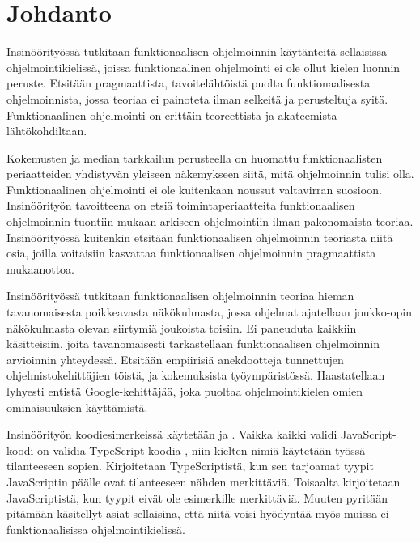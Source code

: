 
\chapter{Johdanto}


Insinöörityössä tutkitaan funktionaalisen ohjelmoinnin käytänteitä sellaisissa ohjelmointikielissä, joissa funktionaalinen ohjelmointi ei ole ollut kielen luonnin peruste. Etsitään pragmaattista, tavoitelähtöistä puolta funktionaalisesta ohjelmoinnista, jossa teoriaa ei painoteta ilman selkeitä ja perusteltuja syitä. Funktionaalinen ohjelmointi on erittäin teoreettista ja akateemista lähtökohdiltaan.

Kokemusten ja median tarkkailun perusteella on huomattu funktionaalisten periaatteiden yhdistyvän yleiseen näkemykseen siitä, mitä ohjelmoinnin tulisi olla. Funktionaalinen ohjelmointi ei ole kuitenkaan noussut valtavirran suosioon. Insinöörityön tavoitteena on etsiä toimintaperiaatteita funktionaalisen ohjelmoinnin tuontiin mukaan arkiseen ohjelmointiin ilman pakonomaista teoriaa. Insinöörityössä kuitenkin etsitään funktionaalisen ohjelmoinnin teoriasta niitä osia, joilla voitaisiin kasvattaa funktionaalisen ohjelmoinnin pragmaattista mukaanottoa.

Insinöörityössä tutkitaan funktionaalisen ohjelmoinnin teoriaa hieman tavanomaisesta poikkeavasta näkökulmasta, jossa ohjelmat ajatellaan joukko-opin näkökulmasta olevan siirtymiä joukoista toisiin. Ei paneuduta kaikkiin käsitteisiin, joita tavanomaisesti tarkastellaan funktionaalisen ohjelmoinnin arvioinnin yhteydessä. Etsitään empiirisiä anekdootteja tunnettujen ohjelmistokehittäjien töistä, ja kokemuksista työympäristössä. Haastatellaan lyhyesti entistä Google-kehittäjää, joka puoltaa ohjelmointikielen omien ominaisuuksien käyttämistä.


Insinöörityön koodiesimerkeissä käytetään  ja . Vaikka kaikki validi JavaScript-koodi on validia TypeScript-koodia \cite{typsecript_website}, niin kielten nimiä käytetään työssä tilanteeseen sopien. Kirjoitetaan TypeScriptistä, kun sen tarjoamat tyypit JavaScriptin päälle ovat tilanteeseen nähden merkittäviä. Toisaalta kirjoitetaan JavaScriptistä, kun tyypit eivät ole esimerkille merkittäviä. Muuten pyritään pitämään käsitellyt asiat sellaisina, että niitä voisi hyödyntää myös muissa ei-funktionaalisissa ohjelmointikielissä.